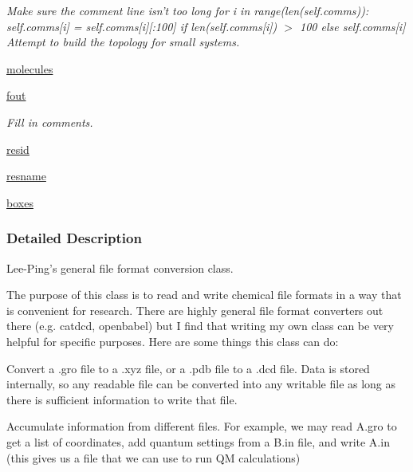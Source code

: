 \begin{DoxyCompactItemize}
\begin{DoxyCompactList}\small\item\em \-Make sure the comment line isn't too long for i in range(len(self.\-comms))\-: self.\-comms\mbox{[}i\mbox{]} = self.\-comms\mbox{[}i\mbox{]}\mbox{[}\-:100\mbox{]} if len(self.\-comms\mbox{[}i\mbox{]}) $>$ 100 else self.\-comms\mbox{[}i\mbox{]} \-Attempt to build the topology for small systems. \end{DoxyCompactList}\item 
\hyperlink{classforcebalance_1_1molecule_1_1Molecule_ac0a283e8dd0d63a852311ccdc904e31f}{molecules}
\item 
\hyperlink{classforcebalance_1_1molecule_1_1Molecule_a7887451529cc2b396240b6e4ebfcc2de}{fout}
\begin{DoxyCompactList}\small\item\em \-Fill in comments. \end{DoxyCompactList}\item 
\hyperlink{classforcebalance_1_1molecule_1_1Molecule_afcd4c8e1671af626d0267a243e69530d}{resid}
\item 
\hyperlink{classforcebalance_1_1molecule_1_1Molecule_a4aebc6ada9bda74a6740568d4f3658eb}{resname}
\item 
\hyperlink{classforcebalance_1_1molecule_1_1Molecule_ac84c67d37f00c0f65e6fb6126e19f9bb}{boxes}
\end{DoxyCompactItemize}


\subsubsection{\-Detailed \-Description}
\-Lee-\/\-Ping's general file format conversion class. 

\-The purpose of this class is to read and write chemical file formats in a way that is convenient for research. \-There are highly general file format converters out there (e.\-g. catdcd, openbabel) but \-I find that writing my own class can be very helpful for specific purposes. \-Here are some things this class can do\-:


\begin{DoxyItemize}
\item \-Convert a .gro file to a .xyz file, or a .pdb file to a .dcd file. \-Data is stored internally, so any readable file can be converted into any writable file as long as there is sufficient information to write that file.
\end{DoxyItemize}


\begin{DoxyItemize}
\item \-Accumulate information from different files. \-For example, we may read \-A.\-gro to get a list of coordinates, add quantum settings from a \-B.\-in file, and write \-A.\-in (this gives us a file that we can use to run \-Q\-M calculations)
\end{DoxyItemize}


